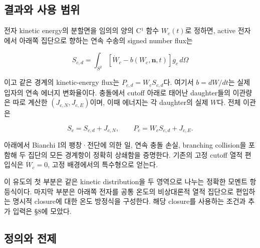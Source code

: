 \documentclass[11pt,a4paper]{article}
\begin{document}
\hypertarget{uxacb0uxacfcuxc640-uxc0acuxc6a9-uxbc94uxc704}{%
\subsection{결과와 사용 범위}\label{uxacb0uxacfcuxc640-uxc0acuxc6a9-uxbc94uxc704}}

전자 kinetic energy의 분할면을 임의의 양의 C¹ 함수 \(W_c(t)\)로 정하면, active 전자에서 아래쪽 집단으로 향하는 연속 수송의 signed number flux는

\[
S_{c,d}=\int_{S^2}[\dot W_c-b(W_c,\boldsymbol n,t)]g_c\,d\Omega
\tag{MC1}
\]

이고 같은 경계의 kinetic-energy flux는 \(P_{c,d}=W_cS_{c,d}\)다. 여기서 \(b=dW/dt\)는 실제 입자의 연속 에너지 변화율이다. 충돌에서 cutoff 아래로 태어난 daughter들의 이관량은 따로 계산한 \((J_{c,N},J_{c,E})\)이며, 이때 에너지는 각 daughter의 실제 \(W\)다. 전체 이관은

\[
S_c=S_{c,d}+J_{c,N},\qquad
P_c=W_cS_{c,d}+J_{c,E}.
\tag{MC2}
\]

아래에서 Bianchi I의 팽창·전단에 의한 일, 연속 충돌 손실, branching collision을 포함해 두 집단의 모든 경계항이 정확히 상쇄함을 증명한다. 기존의 고정 cutoff 열적 편입식은 \(\dot W_c=0\), 고정 배경에서의 특수형으로 얻는다.

이 유도의 첫 부분은 같은 kinetic distribution을 두 영역으로 나누는 정확한 모멘트 항등식이다. 마지막 부분은 아래쪽 전자를 공통 온도의 비상대론적 열적 집단으로 편입하는 명시적 closure에 대한 온도 방정식을 구성한다. 해당 closure를 사용하는 조건과 추가 입력은 §8에 모았다.

\hypertarget{uxc815uxc758uxc640-uxc804uxc81c}{%
\subsection{정의와 전제}\label{uxc815uxc758uxc640-uxc804uxc81c}}
\end{document}
